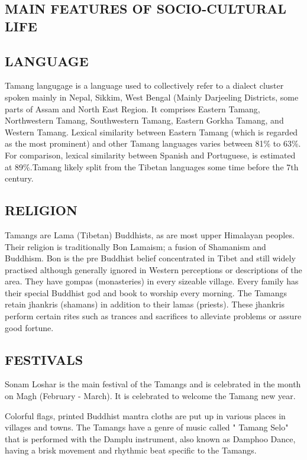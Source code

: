 \documentclass[a4paper,14pt]{article}
\begin{document}
\begin{flushleft}
	\newpage
	\section{MAIN FEATURES OF SOCIO-CULTURAL LIFE}
	\subsection{LANGUAGE}


	Tamang langugage is a language used to collectively refer to a dialect cluster spoken mainly in Nepal, Sikkim, West Bengal (Mainly Darjeeling Districts, some parts of Assam and North East Region. It comprises Eastern Tamang, Northwestern Tamang, Southwestern Tamang, Eastern Gorkha Tamang, and Western Tamang. Lexical similarity between Eastern Tamang (which is regarded as the most prominent) and other Tamang languages varies between 81\% to 63\%. For comparison, lexical similarity between Spanish and Portuguese, is estimated at 89\%.Tamang likely split from the Tibetan languages some time before the 7th century.

	
	\newpage

	\subsection{RELIGION}
	Tamangs are Lama (Tibetan) Buddhists, as are most upper Himalayan peoples. Their religion is traditionally Bon Lamaism; a fusion of Shamanism and Buddhism. Bon is the pre Buddhist belief concentrated in Tibet and still widely practised although generally ignored in Western perceptions or descriptions of the area. They have gompas (monasteries) in every sizeable village. Every family has their special Buddhist god and book to worship every morning. The Tamangs retain jhankris (shamans) in addition to their lamas (priests). These jhankris perform certain rites such as trances and sacrifices to alleviate problems or assure good fortune.


	\newpage
	\subsection{FESTIVALS}
	Sonam Loshar is the main festival of the Tamangs and is celebrated in the month on Magh (February - March). It is celebrated to welcome the Tamang new year.

Colorful flags, printed Buddhist mantra cloths are put up in various places in villages and towns. The Tamangs have a genre of music called " Tamang Selo" that is performed with the Damplu instrument, also known as Damphoo Dance, having a brisk movement and rhythmic beat specific to the Tamangs.


\end{flushleft}
\end{document}
